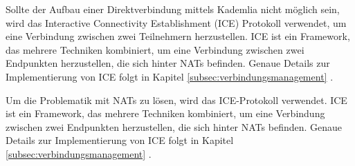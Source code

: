 \noindent Sollte der Aufbau einer Direktverbindung mittels Kademlia nicht möglich sein, wird das Interactive Connectivity Establishment (ICE) Protokoll verwendet, um eine Verbindung zwischen zwei Teilnehmern herzustellen. ICE ist ein Framework, das mehrere Techniken kombiniert, um eine Verbindung zwischen zwei Endpunkten herzustellen, die sich hinter NATs befinden. Genaue Details zur Implementierung von ICE folgt in Kapitel \ref{subsec:verbindungsmanagement} \textit{}.

\noindent Um die Problematik mit NATs zu lösen, wird das ICE-Protokoll verwendet. ICE ist ein Framework, das mehrere Techniken kombiniert, um eine Verbindung zwischen zwei Endpunkten herzustellen, die sich hinter NATs befinden. Genaue Details zur Implementierung von ICE folgt in Kapitel \ref{subsec:verbindungsmanagement} \textit{}.


